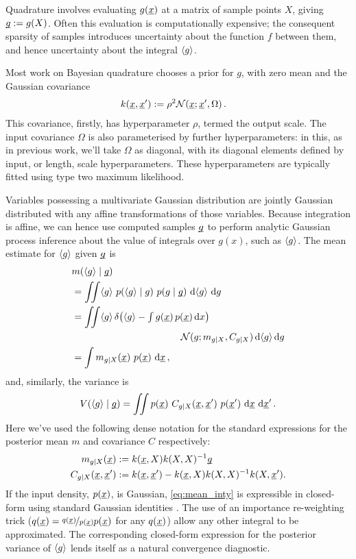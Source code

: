 \documentclass[twoside]{article}
\begin{document}
Quadrature involves evaluating $g(\underline{\smash{x}})$ at a matrix of sample points $X$, giving $\underline{\smash{g}}:= g(X)$. Often this evaluation is computationally expensive; the consequent sparsity of samples introduces uncertainty about the function $f$ between them, and hence uncertainty about the integral $\langle g \rangle$.

Most work on Bayesian quadrature chooses a \gp prior for $g$, with zero mean and the Gaussian covariance 
\begin{align} \label{eq:Gaussian_cov_fn}
k(\underline{\smash{x}},\underline{\smash{x}}') & := \rho^2 \mathcal{N}(\underline{\smash{x}};\underline{\smash{x}}',\Omega)\,.
\end{align} 
This covariance, firstly, has hyperparameter $\rho$, 
termed the output scale. The input covariance $\Omega$ is also parameterised by further hyperparameters: in this, as in previous work, we'll take $\Omega$ as diagonal, with its diagonal elements defined by input, or length, scale hyperparameters.  These hyperparameters are typically fitted using type two maximum likelihood.

Variables possessing a multivariate Gaussian distribution are jointly Gaussian distributed with any affine transformations of those variables. Because integration is affine, we can hence use computed samples $\underline{\smash{g}}$ to perform analytic Gaussian process inference about the value of integrals over $g(x)$, such as $\langle g \rangle$. The mean estimate for $\langle g \rangle$ given $\underline{\smash{g}}$ is
%
\begin{align} 
&
\mean{\inty{g}}{\v{g}} 
\nonumber\\
& =\iint \inty{g}~\p{\inty{g}}{g}~\p{g}{\v{g}}~\ud \inty{g}~\ud g                                                                                                                                                               \nonumber\\
&
 =\iint \inty{g}\,\delta\bigl(\inty{g} - {\textstyle\int g(\vx)\,p(\vx)\,\ud x}\bigr)
\nonumber\\
& \hspace{4cm}
\N{g}{m_{g|X}}{C_{g|X}}\,\ud \inty{g} \,\ud g 
\nonumber\\
&
 = \int m_{g|X}(\vx)~p(\vx)~\ud \vx
\,, \label{eq:mean_inty}
\end{align}
and, similarly, the variance is
\begin{align} 
V(\langle g \rangle\mid\underline{\smash{g}})
=\iint p(\underline{\smash{x}})~C_{g|X}(\underline{\smash{x}}, \underline{\smash{x}}')~p(\underline{\smash{x}}')~\mathrm{d} \underline{\smash{x}}~\mathrm{d} \underline{\smash{x}}'
\,. \label{eq:var_inty}
\end{align}
Here we've used the following dense notation for the standard \gp expressions for the posterior mean $m$ and covariance $C$ respectively:
\begin{align}
m_{g|X}(\underline{\smash{x}})& := k(\underline{\smash{x}}, X) k(X, X)^{-1} \underline{\smash{g}}\\
C_{g|X}(\underline{\smash{x}}, \underline{\smash{x}}')& := k(\underline{\smash{x}}, \underline{\smash{x}}') - k(\underline{\smash{x}}, X) k(X, X)^{-1} k(X, \underline{\smash{x}}').
\end{align}
If the input density, $p(\underline{\smash{x}})$, is Gaussian, \eqref{eq:mean_inty} is expressible in closed-form using standard Gaussian identities \citep{BZMonteCarlo}.
The use of an importance re-weighting trick ($q(\underline{\smash{x}}) = \nicefrac{q(\underline{\smash{x}})}{p(\underline{\smash{x}})} p(\underline{\smash{x}})$ for any $q(\underline{\smash{x}})$) allow any other integral to be approximated. 
%
The corresponding closed-form expression for the posterior variance of $\langle g \rangle$ lends itself as a natural convergence diagnostic. 
\end{document}
